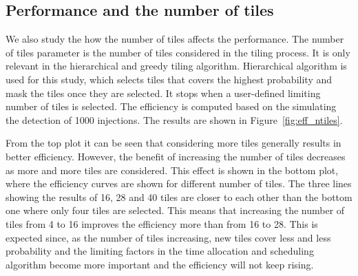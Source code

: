 \documentclass[twocolumn]{aastex61}
\begin{document}
\subsection{Performance and the number of tiles}
We also study the how the number of tiles affects the performance. The number of tiles parameter is the number of tiles considered in the tiling process. It is only relevant in the hierarchical and greedy tiling algorithm. Hierarchical algorithm is used for this study, which selects tiles that covers the highest probability and mask the tiles once they are selected. It stops when a user-defined limiting number of tiles is selected. The efficiency is computed based on the simulating the detection of 1000 injections. The results are shown in Figure~\ref{fig:eff_ntiles}. 

From the top plot it can be seen that considering more tiles generally results in better efficiency. However, the benefit of increasing the number of tiles decreases as more and more tiles are considered. This effect is shown in the bottom plot, where the efficiency curves are shown for different number of tiles. The three lines showing the results of 16, 28 and 40 tiles are closer to each other than the bottom one where only four tiles are selected. This means that increasing the number of tiles from 4 to 16 improves the efficiency more than from 16 to 28. This is expected since, as the number of tiles increasing, new tiles cover less and less probability and the limiting factors in the time allocation and scheduling algorithm become more important and the efficiency will not keep rising.
\end{document}
